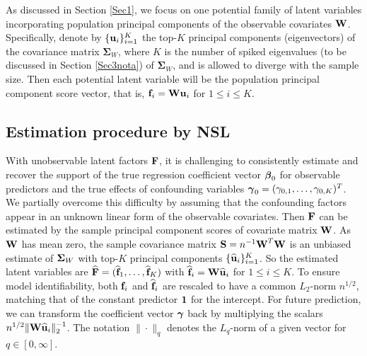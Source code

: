 \documentclass{statsoc}
\newcommand{\bff}{\mbox{\bf f}}
\newcommand{\bu}{\mbox{\bf u}}
\newcommand{\bF}{\mbox{\bf F}}
\newcommand{\bS}{\mbox{\bf S}}
\newcommand{\bW}{\mbox{\bf W}}
\newcommand{\bone}{\mbox{\bf 1}}
\newcommand{\bbeta}{\mbox{\boldmath $\beta$}}
\newcommand{\bgamma}{\mbox{\boldmath $\gamma$}}
\newcommand{\bSig}{\mbox{\boldmath $\Sigma$}}
\newcommand{\Sig}{\mathbf{\Sigma}}
\def\t{^T}
\begin{document}
As discussed in Section \ref{Sec1}, we focus on one potential family of latent variables incorporating population principal components of the observable covariates $\bW$. Specifically, denote by $\{\bu_i\}_{i = 1}^K$ the top-$K$ principal components (eigenvectors) of the covariance matrix $\Sig_W$, where $K$ is the number of spiked eigenvalues (to be discussed in Section \ref{Sec3nota}) of $\Sig_W$, and is allowed to diverge with the sample size. Then each potential latent variable will be the population principal component score vector, that is, $\bff_i = \bW \bu_i$ for $1 \leq i \leq K$.



\subsection{Estimation procedure by NSL}

With unobservable latent factors $\bF$, it is challenging to consistently estimate and recover the support of the true regression coefficient vector $\bbeta_0$ for observable predictors and the true effects of confounding variables $\bgamma_0 = (\gamma_{0,1}, \dots, \gamma_{0,K})\t$. We partially overcome this difficulty by assuming that the confounding factors appear in an unknown linear form of the observable covariates. Then $\bF$ can be estimated by the sample principal component scores of covariate matrix $\bW$. As $\bW$ has mean zero, the sample covariance matrix $\bS = n^{-1} \bW\t \bW$ is an unbiased estimate of $\bSig_W$ with top-$K$ principal components $\{\widehat{\bu}_i\}_{i = 1}^K$. So the estimated latent variables are $\widehat{\bF} = (\widehat{\bff}_1, \dots, \widehat{\bff}_K)$ with $\widehat{\bff}_i = \bW \widehat{\bu}_i$ for $1 \leq i \leq K$. To ensure model identifiability, both $\bff_i$ and $\widehat{\bff}_i$ are rescaled to have a common $L_2$-norm $n^{1/2}$, matching that of the constant predictor $\bone$ for the intercept. For future prediction, we can transform the coefficient vector $\bgamma$ back by multiplying the scalars $n^{1/2} \|\bW \widehat{\bu}_i\|_2^{-1}$. The notation $\| \cdot \|_q$ denotes the $L_q$-norm of a given vector for $q \in [0, \infty]$.
\end{document}
